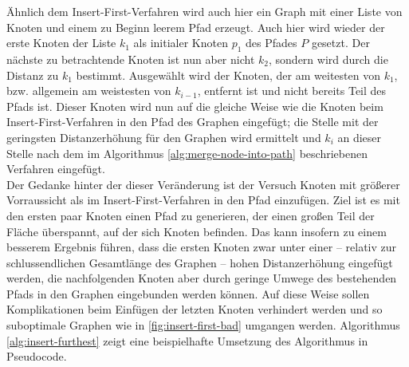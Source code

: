 
Ähnlich dem Insert-First-Verfahren wird auch hier ein Graph mit einer Liste von Knoten und einem zu Beginn leerem Pfad erzeugt.
Auch hier wird wieder der erste Knoten der Liste $k_1$ als initialer Knoten $p_1$ des Pfades $P$ gesetzt.
Der nächste zu betrachtende Knoten ist nun aber nicht $k_2$, sondern wird durch die Distanz zu $k_1$ bestimmt.
Ausgewählt wird der Knoten, der am weitesten von $k_1$, bzw. allgemein am weistesten von $k_{i-1}$, entfernt ist und nicht bereits Teil des Pfads ist.
Dieser Knoten wird nun auf die gleiche Weise wie die Knoten beim Insert-First-Verfahren in den Pfad des Graphen eingefügt; die Stelle mit der geringsten Distanzerhöhung für den Graphen wird ermittelt und $k_i$ an dieser Stelle nach dem im Algorithmus \vref{alg:merge-node-into-path} beschriebenen Verfahren eingefügt.\\
Der Gedanke hinter der dieser Veränderung ist der Versuch Knoten mit größerer Vorraussicht als im Insert-First-Verfahren in den Pfad einzufügen.
Ziel ist es mit den ersten paar Knoten einen Pfad zu generieren, der einen großen Teil der Fläche überspannt, auf der sich Knoten befinden.
Das kann insofern zu einem besserem Ergebnis führen, dass die ersten Knoten zwar unter einer -- relativ zur schlussendlichen Gesamtlänge des Graphen -- hohen Distanzerhöhung eingefügt werden, die nachfolgenden Knoten aber durch geringe Umwege des bestehenden Pfads in den Graphen eingebunden werden können.
Auf diese Weise sollen Komplikationen beim Einfügen der letzten Knoten verhindert werden und so suboptimale Graphen wie in \vref{fig:insert-first-bad} umgangen werden. Algorithmus \vref{alg:insert-furthest} zeigt eine beispielhafte Umsetzung des Algorithmus in Pseudocode.

